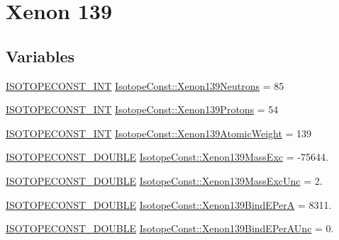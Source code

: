 \hypertarget{group___isotope_const-_xenon-_xe139}{}\section{Xenon 139}
\label{group___isotope_const-_xenon-_xe139}
\subsection*{Variables}
\begin{DoxyCompactItemize}
\item 
\mbox{\hyperlink{group___isotope_const-_macros_ga5f18360b3e99483a35c32d789e62621c}{I\+S\+O\+T\+O\+P\+E\+C\+O\+N\+S\+T\+\_\+\+I\+NT}} \mbox{\hyperlink{group___isotope_const-_xenon-_xe139_ga1e72e06b659d0cbd6200ac1b02ed89ef}{Isotope\+Const\+::\+Xenon139\+Neutrons}} = 85
\item 
\mbox{\hyperlink{group___isotope_const-_macros_ga5f18360b3e99483a35c32d789e62621c}{I\+S\+O\+T\+O\+P\+E\+C\+O\+N\+S\+T\+\_\+\+I\+NT}} \mbox{\hyperlink{group___isotope_const-_xenon-_xe139_gaf6fbb5fceb479fac50c0b783fe3cd6c3}{Isotope\+Const\+::\+Xenon139\+Protons}} = 54
\item 
\mbox{\hyperlink{group___isotope_const-_macros_ga5f18360b3e99483a35c32d789e62621c}{I\+S\+O\+T\+O\+P\+E\+C\+O\+N\+S\+T\+\_\+\+I\+NT}} \mbox{\hyperlink{group___isotope_const-_xenon-_xe139_ga3913f1e24146ec126a51458e2496ff57}{Isotope\+Const\+::\+Xenon139\+Atomic\+Weight}} = 139
\item 
\mbox{\hyperlink{group___isotope_const-_macros_ga8f45a7272ce02c0b4c65c44636ed719a}{I\+S\+O\+T\+O\+P\+E\+C\+O\+N\+S\+T\+\_\+\+D\+O\+U\+B\+LE}} \mbox{\hyperlink{group___isotope_const-_xenon-_xe139_gabeedfead610f9d04d680118e061c61dd}{Isotope\+Const\+::\+Xenon139\+Mass\+Exc}} = -\/75644.
\item 
\mbox{\hyperlink{group___isotope_const-_macros_ga8f45a7272ce02c0b4c65c44636ed719a}{I\+S\+O\+T\+O\+P\+E\+C\+O\+N\+S\+T\+\_\+\+D\+O\+U\+B\+LE}} \mbox{\hyperlink{group___isotope_const-_xenon-_xe139_ga13de3b27a7c722efdf0ce76f8381fdb3}{Isotope\+Const\+::\+Xenon139\+Mass\+Exc\+Unc}} = 2.
\item 
\mbox{\hyperlink{group___isotope_const-_macros_ga8f45a7272ce02c0b4c65c44636ed719a}{I\+S\+O\+T\+O\+P\+E\+C\+O\+N\+S\+T\+\_\+\+D\+O\+U\+B\+LE}} \mbox{\hyperlink{group___isotope_const-_xenon-_xe139_gaf153e0f4bf66ef3b198721009432ec01}{Isotope\+Const\+::\+Xenon139\+Bind\+E\+PerA}} = 8311.
\item 
\mbox{\hyperlink{group___isotope_const-_macros_ga8f45a7272ce02c0b4c65c44636ed719a}{I\+S\+O\+T\+O\+P\+E\+C\+O\+N\+S\+T\+\_\+\+D\+O\+U\+B\+LE}} \mbox{\hyperlink{group___isotope_const-_xenon-_xe139_ga9751427a7d018fba9184ad17aa01a265}{Isotope\+Const\+::\+Xenon139\+Bind\+E\+Per\+A\+Unc}} = 0.

\end{DoxyCompactItemize}
